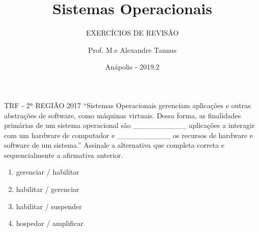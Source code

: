 \documentclass[aspectratio=169,
				xcolor=table]{beamer}
\institute[]{\uppercase{Engenharia de Software}}
\title[]{Sistemas Operacionais}
\subtitle[]{\uppercase{Exercícios de Revisão}}
\author[]{Prof. M.e Alexandre Tannus}
\date{Anápolis - 2019.2}
\begin{document}
	\begin{frame}
		\titlepage		
	\end{frame}

	\begin{frame}{TRF - 2ª REGIÃO 2017}
		“Sistemas Operacionais gerenciam aplicações e outras abstrações de software, como máquinas virtuais. Dessa forma, as finalidades primárias de um sistema operacional são __________ aplicações a interagir com um hardware de computador e __________ os recursos de hardware e software de um sistema.” Assinale a alternativa que completa correta e sequencialmente a afirmativa anterior.
		
		\begin{enumerate}[a]		
			\item gerenciar / habilitar 
			\item habilitar / gerenciar
			\item habilitar / suspender 
			\item hospedar / amplificar
		\end{enumerate}

	\end{frame}
		
	\begin{frame}{}
	\end{frame}	
\end{document}
